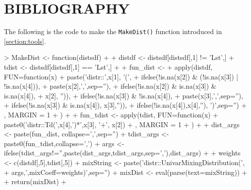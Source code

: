 \documentclass[11pt,notitlepage]{isuthesis}
\begin{document}
% 
% 
% 
% 
% 
%




% 
% 

% 
%     


\clearpage
\nocite{*}
\unappendixtitle
\newpage
{}
{}
\section*{BIBLIOGRAPHY}

\vspace{-20pt}
\begingroup
   \setlength{\bibsep}{14.5pt}
   \linespread{1}\selectfont

\endgroup

\appendix

\label{section:append}


The following is the code to make the \texttt{MakeDist()} function introduced 
in \ref{section:tools}.
\begin{Schunk}
\begin{Sinput}
> MakeDist <- function(distsdf){
+   
+   distdf <- distsdf[distsdf[,1] != 'Lst',]
+   tdist <- distsdf[distsdf[,1] == 'Lst',]
+   
+   fun_dist <- 
+     apply(distdf, FUN=function(x) {
+       paste('distr::',x[1], '(', 
+             ifelse(!is.na(x[2]) & (!is.na(x[3]) | !is.na(x[4])),
+                    paste(x[2],',',sep=''),
+                    ifelse(!is.na(x[2]) & is.na(x[3]) & is.na(x[4]),
+                           x[2], '')), 
+             ifelse(!is.na(x[3]) & !is.na(x[4]),
+                    paste(x[3],',',sep=''),
+                    ifelse(!is.na(x[3]) & is.na(x[4]), x[3],'')), 
+             ifelse(!is.na(x[4]),x[4],''), ')',sep='')
+     }, MARGIN = 1
+     )
+   
+   fun_tdist <- apply(tdist, FUN=function(x) {
+     paste0('distr::Td(',x[4],')*',x[3], '+', x[2])
+   }, MARGIN = 1
+   )
+   
+   dist_args <- paste(fun_dist, collapse=',',sep='')
+   tdist_args <- paste0(fun_tdist,collapse=',')
+   args <- ifelse(tdist_args!='',paste(dist_args,tdist_args,sep=','),dist_args)
+   
+   weights <- c(distdf[,5],tdist[,5])
+   mixString <- paste('distr::UnivarMixingDistribution(',
+                      args,',mixCoeff=weights)',sep='')
+   mixDist <- eval(parse(text=mixString))
+   
+   return(mixDist)
+ }
\end{Sinput}
\end{Schunk}
\end{document}

